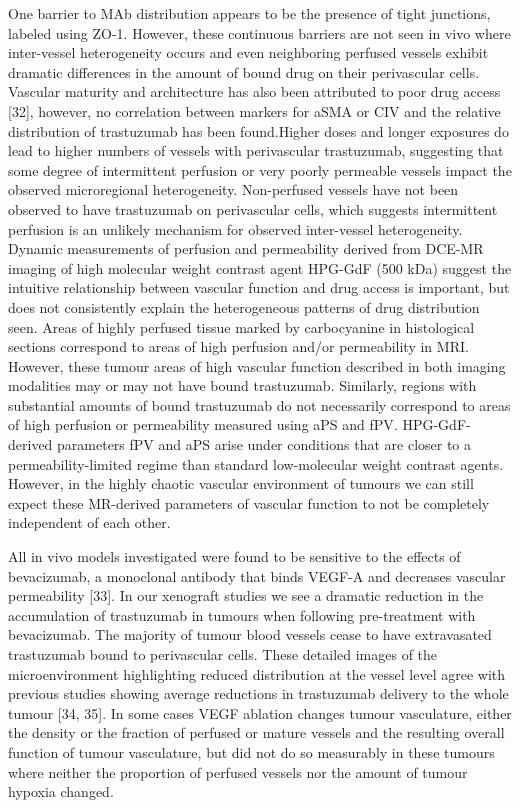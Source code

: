 One barrier to \ac{MAb} distribution appears to be the presence of tight junctions, labeled using ZO-1.
However, these continuous barriers are not seen in vivo where inter-vessel heterogeneity occurs and even neighboring perfused vessels exhibit dramatic differences in the amount of bound drug on their perivascular cells.
Vascular maturity and architecture has also been attributed to poor drug access [32], however, no correlation between markers for aSMA or CIV and the relative distribution of trastuzumab has been found.Higher doses and longer exposures do lead to higher numbers of vessels with perivascular trastuzumab, suggesting that some degree of intermittent perfusion or very poorly permeable vessels impact the observed microregional heterogeneity.
Non-perfused vessels have not been observed to have trastuzumab on perivascular cells, which suggests intermittent perfusion is an unlikely mechanism for observed inter-vessel heterogeneity.
Dynamic measurements of perfusion and permeability derived from DCE-MR imaging of high molecular weight contrast agent \ac{HPG-GdF} (500 kDa) suggest the intuitive relationship between vascular function and drug access is important, but does not consistently explain the heterogeneous patterns of drug distribution seen.
Areas of highly perfused tissue marked by carbocyanine in histological sections correspond to areas of high perfusion and/or permeability in MRI.
However, these tumour areas of high vascular function described in both imaging modalities may or may not have bound trastuzumab.
Similarly, regions with substantial amounts of bound trastuzumab do not necessarily correspond to areas of high perfusion or permeability measured using \ac{aPS} and \ac{fPV}.
HPG-GdF-derived parameters \ac{fPV} and \ac{aPS} arise under conditions that are closer to a permeability-limited regime than standard low-molecular weight contrast agents.
However, in the highly chaotic vascular environment of tumours we can still expect these MR-derived parameters of vascular function to not be completely independent of each other.

All in vivo models investigated were found to be sensitive to the effects of bevacizumab, a monoclonal antibody that binds VEGF-A and decreases vascular permeability [33].
In our xenograft studies we see a dramatic reduction in the accumulation of trastuzumab in tumours when following pre-treatment with bevacizumab.
The majority of tumour blood vessels cease to have extravasated trastuzumab bound to perivascular cells.
These detailed images of the microenvironment highlighting reduced distribution at the vessel level agree with previous studies showing average reductions in trastuzumab delivery to the whole tumour [34, 35].
In some cases VEGF ablation changes tumour vasculature, either the density or the fraction of perfused or mature vessels and the resulting overall function of tumour vasculature, but did not do so measurably in these tumours where neither the proportion of perfused vessels nor the amount of tumour hypoxia changed.

